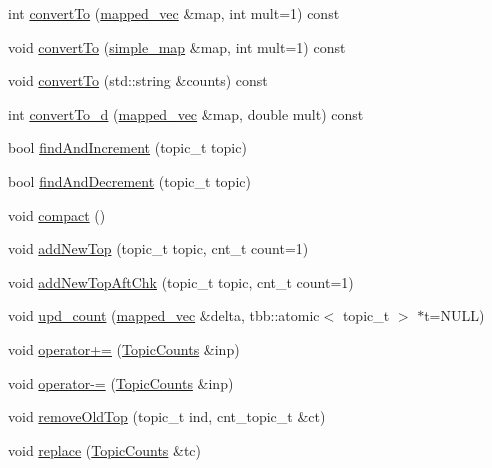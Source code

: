 \begin{DoxyCompactItemize}
\item 
int \hyperlink{struct_topic_counts_a2db273b308ba9485c0cb87600c141936}{convertTo} (\hyperlink{types_8h_a4fed6ff282eca8f2c6ebdb4bc2e99e8b}{mapped\_\-vec} \&map, int mult=1) const 
\item 
void \hyperlink{struct_topic_counts_a874b4422e106155a6a4c09eddf6ff459}{convertTo} (\hyperlink{classsimple__map}{simple\_\-map} \&map, int mult=1) const 
\item 
void \hyperlink{struct_topic_counts_a9550ee80a5fbe0d708b4f760f897d2d5}{convertTo} (std::string \&counts) const 
\item 
int \hyperlink{struct_topic_counts_a966dfd85c2c14918bed470515e88aa3b}{convertTo\_\-d} (\hyperlink{types_8h_a4fed6ff282eca8f2c6ebdb4bc2e99e8b}{mapped\_\-vec} \&map, double mult) const 
\item 
bool \hyperlink{struct_topic_counts_ad4751b60bf3af5a7c532ca547878a3ea}{findAndIncrement} (topic\_\-t topic)
\item 
bool \hyperlink{struct_topic_counts_afd277219286187aaddd4acebc8a944bc}{findAndDecrement} (topic\_\-t topic)
\item 
void \hyperlink{struct_topic_counts_aa00483314f56e5c97f7feec15cf6dde2}{compact} ()
\item 
void \hyperlink{struct_topic_counts_ad23a451d973f5a1a9ea3be5f24191568}{addNewTop} (topic\_\-t topic, cnt\_\-t count=1)
\item 
void \hyperlink{struct_topic_counts_a464225e562d192981988a8c2d412bd31}{addNewTopAftChk} (topic\_\-t topic, cnt\_\-t count=1)
\item 
void \hyperlink{struct_topic_counts_a2aa45ac9efa134fe2977385110854d43}{upd\_\-count} (\hyperlink{types_8h_a4fed6ff282eca8f2c6ebdb4bc2e99e8b}{mapped\_\-vec} \&delta, tbb::atomic$<$ topic\_\-t $>$ $\ast$t=NULL)
\item 
void \hyperlink{struct_topic_counts_af65a213b5195d6c2ba547e28e3727b91}{operator+=} (\hyperlink{struct_topic_counts}{TopicCounts} \&inp)
\item 
void \hyperlink{struct_topic_counts_a1317117ae2bff6188196ffec46f23dc5}{operator-\/=} (\hyperlink{struct_topic_counts}{TopicCounts} \&inp)
\item 
void \hyperlink{struct_topic_counts_a623d6cd7178f596cffee5047ccb95d49}{removeOldTop} (topic\_\-t ind, cnt\_\-topic\_\-t \&ct)
\item 
void \hyperlink{struct_topic_counts_a4b92d60f9c8f202924803d903ebc3c34}{replace} (\hyperlink{struct_topic_counts}{TopicCounts} \&tc)
\item 

\end{DoxyCompactItemize}
